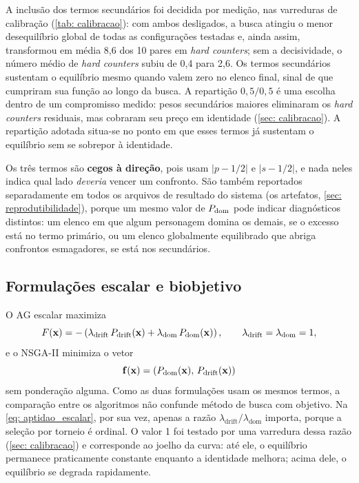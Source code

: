 A inclusão dos termos secundários foi decidida por medição, nas varreduras de calibração (\autoref{tab: calibracao}): com ambos desligados, a busca atingiu o menor desequilíbrio global de todas as configurações testadas e, ainda assim, transformou em média 8,6 dos 10 pares em \textit{hard counters}; sem a decisividade, o número médio de \textit{hard counters} subiu de 0,4 para 2,6. Os termos secundários sustentam o equilíbrio mesmo quando valem zero no elenco final, sinal de que cumpriram sua função ao longo da busca. A repartição $0{,}5/0{,}5$ é uma escolha dentro de um compromisso medido: pesos secundários maiores eliminaram os \textit{hard counters} residuais, mas cobraram seu preço em identidade (\autoref{sec: calibracao}). A repartição adotada situa-se no ponto em que esses termos já sustentam o equilíbrio sem se sobrepor à identidade.

Os três termos são \textbf{cegos à direção}, pois usam $|p - 1/2|$ e $|s - 1/2|$, e nada neles indica qual lado \textit{deveria} vencer um confronto. São também reportados separadamente em todos os arquivos de resultado do sistema (os artefatos, \autoref{sec: reprodutibilidade}), porque um mesmo valor de $P_{\mathrm{dom}}$ pode indicar diagnósticos distintos: um elenco em que algum personagem domina os demais, se o excesso está no termo primário, ou um elenco globalmente equilibrado que abriga confrontos esmagadores, se está nos secundários.

\subsection{Formulações escalar e biobjetivo}
\label{sub: formulacoes}

O AG escalar maximiza
\begin{equation}
    \label{eq: aptidao_escalar}
    F(\mathbf{x}) = -\left( \lambda_{\mathrm{drift}}\, P_{\mathrm{drift}}(\mathbf{x}) + \lambda_{\mathrm{dom}}\, P_{\mathrm{dom}}(\mathbf{x}) \right),
    \qquad \lambda_{\mathrm{drift}} = \lambda_{\mathrm{dom}} = 1,
\end{equation}
e o NSGA-II minimiza o vetor
\begin{equation}
    \label{eq: aptidao_vetorial}
    \mathbf{f}(\mathbf{x}) = \left( P_{\mathrm{dom}}(\mathbf{x}),\, P_{\mathrm{drift}}(\mathbf{x}) \right)
\end{equation}
sem ponderação alguma. Como as duas formulações usam os mesmos termos, a comparação entre os algoritmos não confunde método de busca com objetivo. Na \autoref{eq: aptidao_escalar}, por sua vez, apenas a razão $\lambda_{\mathrm{drift}}/\lambda_{\mathrm{dom}}$ importa, porque a seleção por torneio é ordinal. O valor 1 foi testado por uma varredura dessa razão (\autoref{sec: calibracao}) e corresponde ao joelho da curva: até ele, o equilíbrio permanece praticamente constante enquanto a identidade melhora; acima dele, o equilíbrio se degrada rapidamente.

